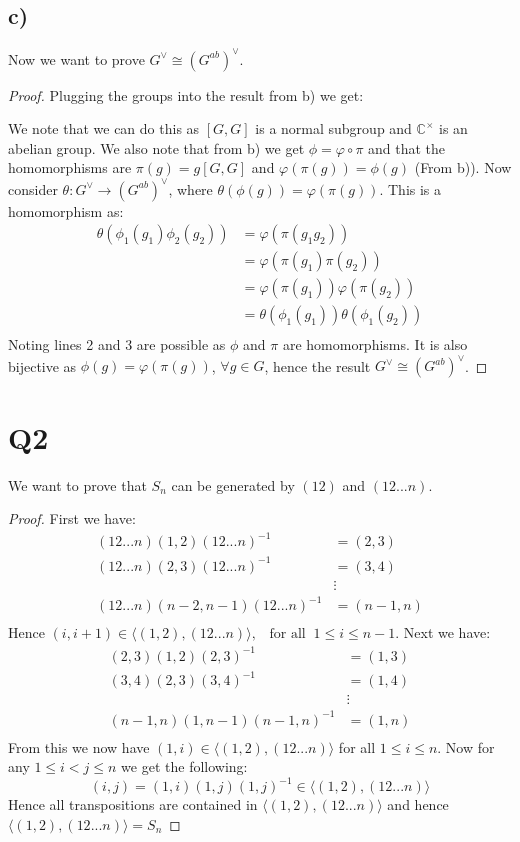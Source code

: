 \documentclass{article}
\begin{document}
\subsection*{c)}
Now we want to prove $G^{\vee}\cong(G^{ab})^{\vee}$.
\begin{proof}
Plugging the groups into the result from b) we get:
\newline
\begin{center}
\end{center}
We note that we can do this as $[G,G]$ is a normal subgroup and $\mathbb{C}^{\times}$ is an abelian group. We also note that from b) we get $\phi=\varphi\circ\pi$ and that the homomorphisms are $\pi(g)=g[G,G]$ and $\varphi(\pi(g))=\phi(g)$ (From b)). Now consider $\theta:G^{\vee}\rightarrow(G^{ab})^{\vee}$, where $\theta(\phi(g))=\varphi(\pi(g))$. This is a homomorphism as:
\begin{align*}
\theta(\phi_1(g_1)\phi_2(g_2))&=\varphi(\pi(g_1g_2))\\
&=\varphi(\pi(g_1)\pi(g_2))\\
&=\varphi(\pi(g_1))\varphi(\pi(g_2))\\
&=\theta(\phi_1(g_1))\theta(\phi_1(g_2))\\
\end{align*}
Noting lines 2 and 3 are possible as $\phi$ and $\pi$ are homomorphisms. It is also bijective as $\phi(g)=\varphi(\pi(g))$, $\forall g\in G$, hence the result $G^{\vee}\cong(G^{ab})^{\vee}$.
\end{proof}
\section*{Q2}
We want to prove that $S_n$ can be generated by $(12)$ and $(12 ... n)$.
\begin{proof}
First we have:
\begin{align*}
(12...n)(1,2)(12...n)^{-1}&=(2,3)\\
(12...n)(2,3)(12...n)^{-1}&=(3,4)\\
&\vdots\\
(12...n)(n-2,n-1)(12...n)^{-1}&=(n-1,n)\\
\end{align*}
Hence $(i,i+1)\in\langle(1,2),(12...n)\rangle,\;\;\;\text{for all}\;\;1\leq i\leq n-1$. Next we have:
\begin{align*}
(2,3)(1,2)(2,3)^{-1}&=(1,3)\\
(3,4)(2,3)(3,4)^{-1}&=(1,4)\\
&\vdots\\
(n-1,n)(1,n-1)(n-1,n)^{-1}&=(1,n)\\
\end{align*}
From this we now have $(1,i)\in\langle (1,2),(12...n)\rangle$ for all $1\leq i\leq n$. Now for any $1\leq i<j\leq n$ we get the following:
$$(i,j)=(1,i)(1,j)(1,j)^{-1}\in\langle(1,2),(12...n)\rangle$$
Hence all transpositions are contained in $\langle(1,2),(12...n)\rangle$ and hence $\langle(1,2),(12...n)\rangle=S_n$ 
\end{proof}
\end{document}
